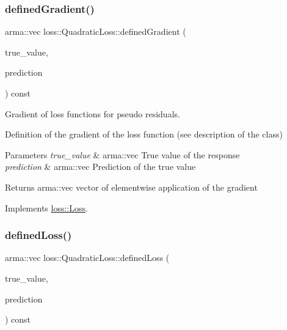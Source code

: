 \mbox{\label{classloss_1_1_quadratic_loss_adb4da1acbad702b5ba8570abaa17d373}} 
\subsubsection{\texorpdfstring{defined\+Gradient()}{definedGradient()}}
{\footnotesize\ttfamily arma\+::vec loss\+::\+Quadratic\+Loss\+::defined\+Gradient (\begin{DoxyParamCaption}\item[{const arma\+::vec \&}]{true\+\_\+value,  }\item[{const arma\+::vec \&}]{prediction }\end{DoxyParamCaption}) const\hspace{0.3cm}{\ttfamily [virtual]}}



Gradient of loss functions for pseudo residuals. 

Definition of the gradient of the loss function (see description of the class)


\begin{DoxyParams}{Parameters}
{\em true\+\_\+value} & {\ttfamily arma\+::vec} True value of the response \\
\hline
{\em prediction} & {\ttfamily arma\+::vec} Prediction of the true value\\
\hline
\end{DoxyParams}
\begin{DoxyReturn}{Returns}
{\ttfamily arma\+::vec} vector of elementwise application of the gradient 
\end{DoxyReturn}


Implements \hyperlink{classloss_1_1_loss_a267a4de70747ade4b2d84ce35a448979}{loss\+::\+Loss}.

\mbox{\label{classloss_1_1_quadratic_loss_ae34f68243ffe021e309ed73a68796e1e}} 
\subsubsection{\texorpdfstring{defined\+Loss()}{definedLoss()}}
{\footnotesize\ttfamily arma\+::vec loss\+::\+Quadratic\+Loss\+::defined\+Loss (\begin{DoxyParamCaption}\item[{const arma\+::vec \&}]{true\+\_\+value,  }\item[{const arma\+::vec \&}]{prediction }\end{DoxyParamCaption}) const\hspace{0.3cm}{\ttfamily [virtual]}}



